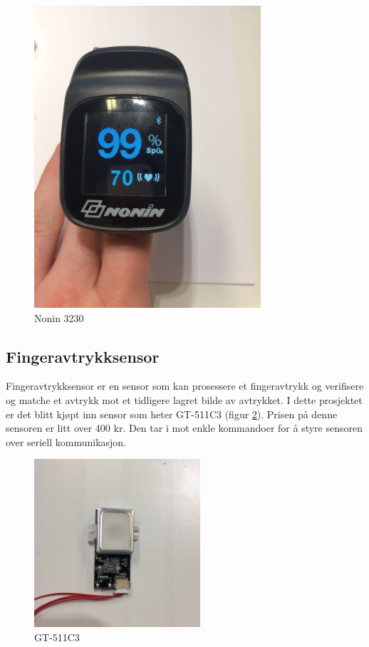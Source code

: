\begin{figure}
\includegraphics[width=0.75\textwidth, center]{fig/prototype/nonin3230ble}
\caption{Nonin 3230}
\label{fig:nonin-3230}
\end{figure}

\subsection{Fingeravtrykksensor}
Fingeravtrykksensor er en sensor som kan prosessere et fingeravtrykk og verifisere og matche et avtrykk mot
et tidligere lagret bilde av avtrykket. I dette prosjektet er det blitt kjøpt inn sensor som heter GT-511C3 (figur \ref{fig:gt511c3}).
Prisen på denne sensoren er litt over 400 kr. Den tar i mot enkle kommandoer for å styre sensoren over seriell kommunikasjon.

\begin{figure}
\includegraphics[width=0.55\textwidth, center]{fig/prototype/fingerprintsensor}
\caption{GT-511C3}
\label{fig:gt511c3}
\end{figure}


